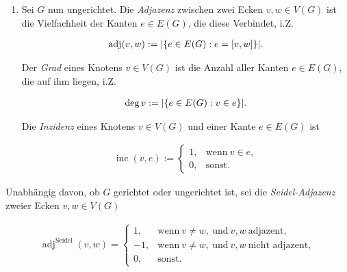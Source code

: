 \begin{definition}
\begin{enumerate}[
                wide,
                labelindent = 0pt
            ]
                \item Sei $G$ nun ungerichtet.
                Die \textit{Adjazenz} zwischen zwei Ecken $v, w \in V(G)$ ist die Vielfachheit der Kanten $e \in E(G)$, die diese Verbindet, i.Z.
        
                \begin{align*}
                    \operatorname{adj}(v, w)
                    :=
                    |{\left \{ e \in E(G): e = [v, w] \right \}}|.
                \end{align*}
        
                Der \textit{Grad} eines Knotens $v \in V(G)$ ist die Anzahl aller Kanten $e \in E(G)$, die auf ihm liegen, i.Z.
        
                \begin{align*}
                    \deg v
                    :=
                    |{\left \{ e \in E(G): v \in e \right \}}|.
                \end{align*}
        
                Die \textit{Inzidenz} eines Knotens $v \in V(G)$ und einer Kante $e \in E(G)$ ist
        
                \begin{align*}
                    \operatorname{inc}(v, e)
                    :=
                    \begin{cases}
                        1, & \text{wenn}~ v \in e, \\
                        0, & \text{sonst}.
                    \end{cases}
                \end{align*}    

            \end{enumerate}

            Unabhängig davon, ob $G$ gerichtet oder ungerichtet ist, sei die \textit{Seidel-Adjazenz} zweier Ecken $v, w \in V(G)$
        
            \begin{align*}
                \operatorname{adj}^\text{Seidel}(v, w)
                =
                \begin{cases}
                        1, & \text{wenn}~ v \neq w, ~\text{und}~ v, w ~\text{adjazent}, \\
                    -1, & \text{wenn}~ v \neq w, ~\text{und}~ v, w ~\text{nicht adjazent}, \\
                        0, & \text{sonst}.
                \end{cases}
            \end{align*}

        \end{definition}

